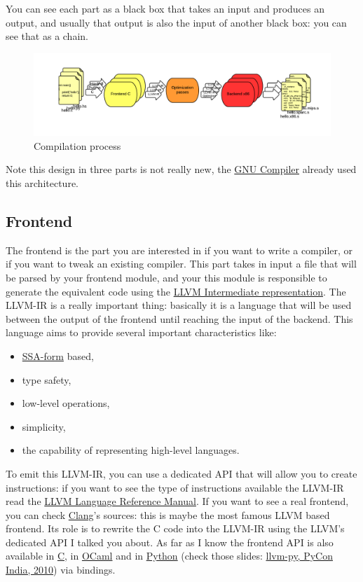 \documentclass[a4paper, 11pt, notitlepage]{report}
\begin{document}
You can see each part as a black box that takes an input and produces an output, and usually that output is also the input of another black box: you can see that as a chain.
\begin{figure}[H]
  \centering
  \includegraphics[width=\textwidth]{pics/pipeline.png}
  \caption{Compilation process}
\end{figure}

Note this design in three parts is not really new, the \href{http://gcc.gnu.org/}{GNU Compiler} already used this architecture.

\subsection{Frontend}
The frontend is the part you are interested in if you want to write a compiler, or if you want to tweak an existing compiler. This part takes in input a file that will be parsed by your frontend module, and your this module is responsible to generate the equivalent code using the \href{http://llvm.org/docs/LangRef.html}{LLVM Intermediate representation}. The LLVM-IR is a really important thing: basically it is a language that will be used between the output of the frontend until reaching the input of the backend. This language aims to provide several important characteristics like:
\begin{itemize}
	\item \href{http://en.wikipedia.org/wiki/Static_single_assignment_form}{SSA-form} based,
	\item type safety,
	\item low-level operations,
	\item simplicity,
	\item the capability of representing high-level languages.
\end{itemize}

To emit this LLVM-IR, you can use a dedicated API that will allow you to create instructions: if you want to see the type of instructions available the LLVM-IR read the \href{http://llvm.org/docs/LangRef.html}{LLVM Language Reference Manual}. If you want to see a real frontend, you can check \href{http://clang.llvm.org/}{Clang}'s sources: this is maybe the most famous LLVM based frontend. Its role is to rewrite the C code into the LLVM-IR using the LLVM's dedicated API I talked you about. As far as I know the frontend API is also available in \href{https://llvm.org/viewvc/llvm-project/llvm/trunk/include/llvm-c/}{C}, in \href{https://llvm.org/viewvc/llvm-project/llvm/trunk/bindings/ocaml/}{OCaml} and in \href{https://llvm.org/viewvc/llvm-project/llvm/trunk/bindings/python/}{Python} (check those slides: \href{http://fr.slideshare.net/mdevan/llvmpy-w}{llvm-py, PyCon India, 2010}) via bindings.
\end{document}
